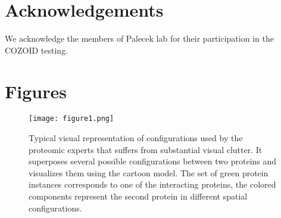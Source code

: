 \documentclass{bmcart}
\begin{document}
\begin{backmatter}
\section*{Acknowledgements}
We acknowledge the members of Palecek lab for their participation in the COZOID testing. 






\section*{Figures}
  \begin{figure}[h!]
  \centering
  \texttt{[image: figure1.png]}
 \caption{
	Typical visual representation of configurations used by the proteomic experts that suffers from substantial visual clutter. It superposes several possible configurations between two proteins and visualizes them using the cartoon model. The set of green protein instances corresponds to one of the interacting proteins, the colored components represent the second protein in different spatial configurations.}
  \label{fig:problem}
\end{figure}


\end{backmatter}
\end{document}
